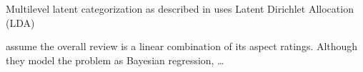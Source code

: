 
Multilevel latent categorization as described in \textcite{Guo.2009} uses Latent Dirichlet Allocation (LDA) 


\textcite{Wang.2010} assume the overall review is a linear combination of its aspect ratings. Although they model the problem as Bayesian regression, \dots %